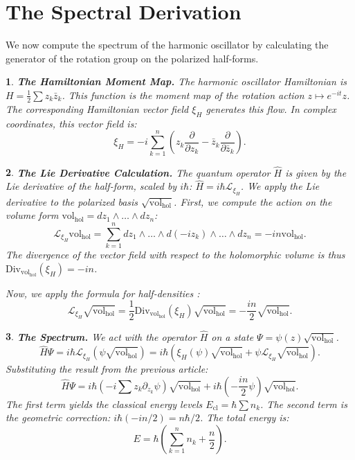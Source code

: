 \documentclass[11pt,reqno,letterpaper,twoside]{amsart}
\theoremstyle{articlestyle}
\newtheorem{article}{}
\theoremstyle{plain}
\theoremstyle{definition}
\def\artlabel[#1]{\textbf{#1.}}
\newcommand{\0}{\hat{0}}
\newcommand{\1}{\hat{1}}
\newcommand{\cl}{\mathrm{cl}}
\newcommand{\hol}{\mathrm{hol}}
\newcommand{\vol}{\mathrm{vol}}
\begin{document}
  
  \section{\textbf{The Spectral Derivation}}
  \label{sec:Spectrum}
  
  We now compute the spectrum of the harmonic oscillator by calculating the generator of the rotation group on the polarized half-forms.
  
  \begin{article}\artlabel[The Hamiltonian Moment Map]
    The harmonic oscillator Hamiltonian is $H = \frac{1}{2} \sum z_k \bar{z}_k$.
    This function is the moment map of the rotation action $z \mapsto e^{-it}z$.
    The corresponding Hamiltonian vector field $\xi_H$ generates this flow.
    In complex coordinates,
    this vector field is:
    $$
      \xi_H = -i \sum_{k=1}^n \left( z_k \frac{\partial}{\partial z_k} - \bar{z}_k \frac{\partial}{\partial \bar{z}_k} \right).
      $$
  \end{article}
  
  \begin{article}\artlabel[The Lie Derivative Calculation]
    \label{art:The Lie Derivative of a Half-Form}
    The quantum operator $\hat{H}$ is given by the Lie derivative of the half-form, scaled by $i\hbar$:
    $\hat{H} = i\hbar \mathcal{L}_{\xi_H}$.
    We apply the Lie derivative to the polarized basis $\sqrt{\vol_{\hol}}$.
    First, we compute the action on the volume form $\vol_{\hol} = dz_1 \wedge \dots \wedge dz_n$:
    $$
      \mathcal{L}_{\xi_H} \vol_{\hol} = \sum_{k=1}^n dz_1 \wedge \dots \wedge d(-i z_k) \wedge \dots \wedge dz_n = -in \vol_{\hol}.
      $$
    The divergence of the vector field with respect to the holomorphic volume is thus $\mathrm{Div}_{\vol_{\hol}}(\xi_H) = -in$.
    
    Now, we apply the formula for half-densities \cite{Woo92, GS77}:
    $$
      \mathcal{L}_{\xi_H} \sqrt{\vol_{\hol}} = \frac{1}{2} \mathrm{Div}_{\vol_{\hol}}(\xi_H) \sqrt{\vol_{\hol}} = -\frac{in}{2} \sqrt{\vol_{\hol}}.
      $$
  \end{article}
  
  \begin{article}\artlabel[The Spectrum]
    We act with the operator $\hat{H}$ on a state $\Psi = \psi(z) \sqrt{\vol_{\hol}}$.
    $$
      \hat{H} \Psi = i\hbar \mathcal{L}_{\xi_H} (\psi \sqrt{\vol_{\hol}}) = i\hbar \left( \xi_H(\psi) \sqrt{\vol_{\hol}} + \psi \mathcal{L}_{\xi_H} \sqrt{\vol_{\hol}} \right).
      $$
    Substituting the result from the previous article:
    $$
      \hat{H} \Psi = i\hbar (-i \sum z_k \partial_{z_k} \psi) \sqrt{\vol_{\hol}} + i\hbar \left( -\frac{in}{2} \psi \right) \sqrt{\vol_{\hol}}.
      $$
    The first term yields the classical energy levels $E_{\cl} = \hbar \sum n_k$.
    The second term is the geometric correction:
    $i\hbar(-in/2) = n\hbar/2$.
    The total energy is:
    $$
      E = \hbar \left( \sum_{k=1}^n n_k + \frac{n}{2} \right).
      $$
  \end{article}
  
\end{document}
